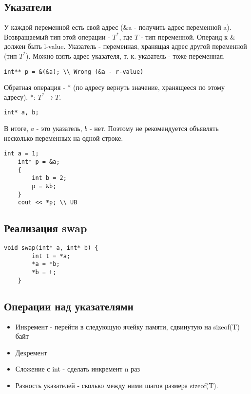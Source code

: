 \subsection{Указатели}

У каждой переменной есть свой адрес (\&a - получить адрес переменной a). Возвращаемый тип этой операции - $T^{*}$, где $T$ - тип переменной. Операнд к \& должен быть l-value. Указатель - переменная, хранящая адрес другой переменной (тип $T^{*}$). Можно взять адрес указателя, т. к. указатель - тоже переменная.

\begin{Verbatim}[tabsize=4]
	int** p = &(&a); \\ Wrong (&a - r-value)
\end{Verbatim}

Обратная операция - * (по адресу вернуть значение, хранящееся по этому адресу). *: $T^{*} \rightarrow T$.

\begin{Verbatim}[tabsize=4]
	int* a, b;
\end{Verbatim}

В итоге, $a$ - это указатель, $b$ - нет. Поэтому не рекомендуется объявлять несколько переменных на одной строке.

\begin{Verbatim}[tabsize=4]
	int a = 1;
	int* p = &a;
	{
		int b = 2;
		p = &b;
	}
	cout << *p; \\ UB
\end{Verbatim}

\subsection{Реализация swap}

\begin{Verbatim}[tabsize=4]
	void swap(int* a, int* b) {
		int t = *a;
		*a = *b;
		*b = t;
	}
\end{Verbatim}


\subsection{Операции над указателями}

\begin{itemize}
	\item Инкремент - перейти в следующую ячейку памяти, сдвинутую на sizeof(T) байт
	\item Декремент
	\item Сложение с int - сделать инкремент n раз
	\item Разность указателей - сколько между ними шагов размера sizeof(T).
\end{itemize}









